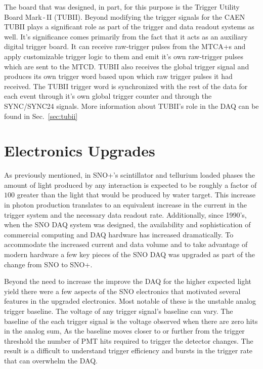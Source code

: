 The board that was designed, in part, for this purpose is the Trigger Utility
Board Mark\,-\,II (TUBII).
Beyond modifying the trigger signals for the CAEN TUBII plays a significant
role as part of the trigger and data readout systems as well.
It's significance comes primarily from the fact that it acts as an auxiliary
digital trigger board. It can receive raw-trigger pulses from the MTCA+s and apply
customizable trigger logic to them and emit it's own raw-trigger pulses which are
sent to the MTCD\@.
TUBII also receives the global trigger signal and produces its own trigger
word based upon which raw trigger pulses it had received. The TUBII trigger
word is synchronized with the rest of the data for each event through it's own
global trigger counter and through the SYNC/SYNC24 signals. More information about
TUBII's role in the DAQ can be found in Sec.~\ref{sec:tubii}


\section{Electronics Upgrades}
\label{sec:upgrades}
As previously mentioned, in SNO+'s scintillator and tellurium loaded phases the
amount of light produced by any interaction is expected to be roughly a factor
of $100$ greater than the light that would be produced by water target.
This increase in photon production translates to an equivalent increase in the
current in the trigger system and the necessary data readout rate.
Additionally, since 1990's, when the SNO DAQ system was designed, the availability
and sophistication of commercial computing and DAQ hardware has increased
dramatically.
To accommodate the increased current and data volume and to take advantage of modern
hardware a few key pieces of the SNO DAQ was upgraded as part of the change from
SNO to SNO+.

Beyond the need to increase the improve the DAQ for the higher expected light
yield there were a few aspects of the SNO electronics that motivated several
features in the upgraded electronics.
Most notable of these is the unstable analog trigger baseline.
The voltage of any trigger signal's baseline can vary.
The baseline of the each trigger signal is the voltage observed
when there are zero hits in the analog sum,
As the baseline moves closer to or further from the trigger threshold
the number of PMT hits required to trigger the detector changes.
The result is a difficult to understand trigger efficiency and bursts in the trigger
rate that can overwhelm the DAQ\@.

